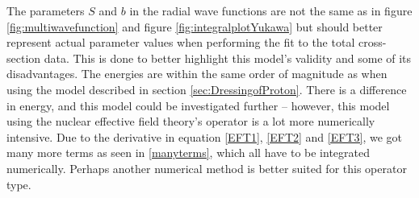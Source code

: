 The parameters $S$ and $b$ in the radial wave functions are not the same as in figure \ref{fig:multiwavefunction} and figure \ref{fig:integralplotYukawa} but should better represent actual parameter values when performing the fit to the total cross-section data. This is done to better highlight this model's validity and some of its disadvantages. The energies are within the same order of magnitude as when using the model described in section \ref{sec:DressingofProton}. There is a difference in energy, and this model could be investigated further -- however, this model using the nuclear effective field theory's operator is a lot more numerically intensive. Due to the derivative in equation \eqref{EFT1}, \eqref{EFT2} and \eqref{EFT3}, we got many more terms as seen in \eqref{manyterms}, which all have to be integrated numerically. Perhaps another numerical method is better suited for this operator type.
